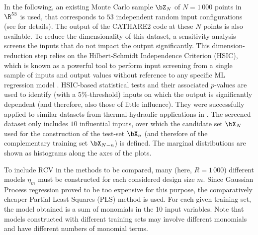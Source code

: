 In the following, an existing Monte Carlo sample $\bZ_N$ of $N=1\,000$ points in $\R^{53}$ is used, that corresponds to $53$ independent random input configurations (see \citealp{ioobou10} for details). 
The output of the CATHARE2 code at these $N$ points is also available. 
To reduce the dimensionality of this dataset, a sensitivity analysis \citep{daveiga_iooss_2021} screens the inputs that do not impact the output significantly. 
This dimension-reduction step relies on the Hilbert-Schmidt Independence Criterion (HSIC), which is known as a powerful tool to perform input screening from a single sample of inputs and output values without reference to any specific ML regression model \citep{daveiga_2015}. 
HSIC-based statistical tests and their associated $p$-values are used to identify (with a $5\%$-threshold) inputs on which the output is significantly dependent (and therefore, also those of little influence). 
They were successfully applied to similar datasets from thermal-hydraulic applications in \citet{marrel_chabridon_2021,marrel_iscream_2022}. 
The screened dataset only includes $10$ influential inputs, over which the candidate set $\bX_N$ used for the construction of the test-set $\bX_n$ (and therefore of the complementary training set $\bX_{N-n}$) is defined. 
The marginal distributions are shown as histograms along the axes of the plots.

To include RCV in the methods to be compared, many (here, $R=1\,000$) different models $\eta_m$ must be constructed for each considered design size $m$. 
Since Gaussian Process regression proved to be too expensive for this purpose, the comparatively cheaper Partial Least Squares (PLS) method \citep{wolsjo01} is used. 
For each given training set, the model obtained is a sum of monomials in the 10 input variables. 
Note that models constructed with different training sets may involve different monomials and have different numbers of monomial terms. 


